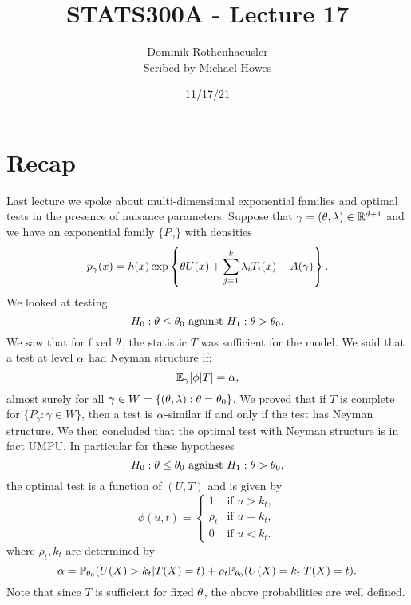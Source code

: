 




\title{STATS300A - Lecture 17}
\author{Dominik Rothenhaeusler\\ Scribed by Michael Howes}
\date{11/17/21}

\pagestyle{fancy}
\fancyhf{}


\maketitle
\tableofcontents
\section{Recap}
Last lecture we spoke about multi-dimensional exponential families and optimal tests in the presence of nuisance parameters. Suppose that $\gamma = ({\theta},\lambda) \in {\mathbb R}^{d+1}$ and we have an exponential family $\{P_\gamma\}$ with densities 
\[p_\gamma(x) = h(x)\exp\left\{{\theta} U(x)+\sum_{j=1}^k \lambda_iT_i(x)-A(\gamma)\right\}. \]
We looked at testing 
\[H_0 : {\theta} \le {\theta}_0 \text{ against } H_1 : {\theta} > {\theta}_0. \]
We saw that for fixed ${\theta}$, the statistic $T$ was sufficient for the model. We said that a test at level ${\alpha}$ had Neyman structure if:
\[{\mathbb{E}}_\gamma[\phi|T] = {\alpha}, \]
almost surely for all $\gamma \in W = \{({\theta},\lambda):{\theta}={\theta}_0\}$. We proved that if $T$ is complete for $\{P_\gamma : \gamma  \in W\}$, then a test is ${\alpha}$-similar if and only if the test has Neyman structure. We then concluded that the optimal test with Neyman structure is in fact UMPU. In particular for these hypotheses 
\[H_0 : {\theta} \le {\theta}_0 \text{ against } H_1 : {\theta} > {\theta}_0, \]
the optimal test is a function of $(U,T)$ and is given by
\[\phi(u,t) = \begin{cases}
    1 & \text{if } u > k_t,\\
    \rho_t & \text{if } u = k_t,\\
    0 & \text{if } u < k_t.
\end{cases} \]
where $\rho_t,k_t$ are determined by 
\[{\alpha} = {\mathbb{P}}_{{\theta}_0}(U(X) > k_t|T(X)=t) + \rho_t {\mathbb{P}}_{{\theta}_0}(U(X)=k_t|T(X)=t). \]
Note that since $T$ is sufficient for fixed ${\theta}$, the above probabilities are well defined.
